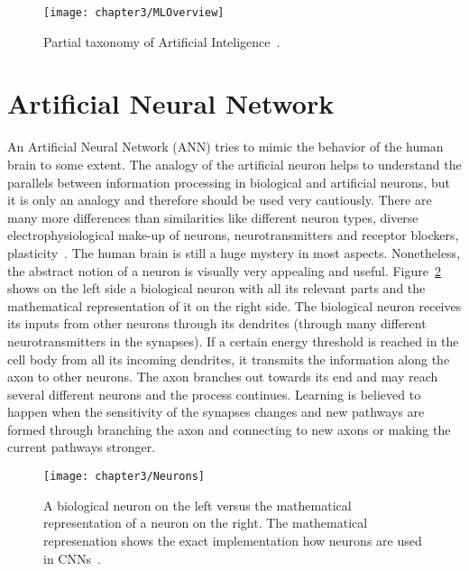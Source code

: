\begin{figure}[!h]
  \centering
  \caption{Partial taxonomy of Artificial Inteligence~\cite{alom2018history}.}
  \texttt{[image: chapter3/MLOverview]}
  \label{fig:MLOverview}
\end{figure}

\section{Artificial Neural Network}

An Artificial Neural Network (ANN) tries to mimic the behavior of the human brain to some extent. The analogy of the artificial neuron helps to understand the parallels between information processing in biological and artificial neurons, but it is only an analogy and therefore should be used very cautiously. There are many more differences than similarities like different neuron types, diverse electrophysiological make-up of neurons, neurotransmitters and receptor blockers, plasticity~\cite{brunel2014single, london2005dendritic}. The human brain is still a huge mystery in most aspects. Nonetheless, the abstract notion of a neuron is visually very appealing and useful. Figure~\ref{fig:Neurons} shows on the left side a biological neuron with all its relevant parts and the mathematical representation of it on the right side. The biological neuron receives its inputs from other neurons through its dendrites (through many different neurotransmitters in the synapses). If a certain energy threshold is reached in the cell body from all its incoming dendrites, it transmits the information along the axon to other neurons. The axon branches out towards its end and may reach several different neurons and the process continues. Learning is believed to happen when the sensitivity of the synapses changes and new pathways are formed through branching the axon and connecting to new axons or making the current pathways stronger.


\begin{figure}[!h]
  \centering
  \caption{A biological neuron on the left versus the mathematical representation of a neuron on the right. The mathematical represenation shows the exact implementation how neurons are used in CNNs~\cite{cs231neuralnetworks}.}
  \texttt{[image: chapter3/Neurons]}
  \label{fig:Neurons}
\end{figure}

\quad

